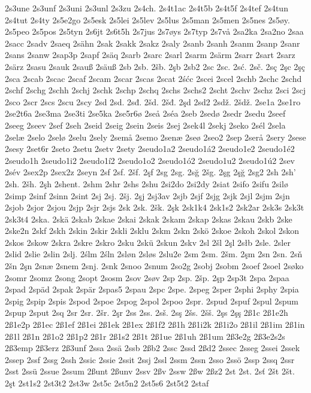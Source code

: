 2s3une
2s3unf
2s3uni
2s3unl
2s3zu
2s4ch.
2s4t1ac
2s4t5b
2s4t5f
2s4tef
2s4tun
2s4tut
2s4ty
2s5e2go
2s5esk
2s5lei
2s5lev
2s5lus
2s5man
2s5men
2s5nes
2s5øy.
2s5peo
2s5pos
2s5tyn
2s6jt
2s6t5h
2s7jus
2s7øys
2s7typ
2s7vå
2sa2ka
2sa2no
2saa
2sacc
2sadv
2saeq
2sähn
2sak
2sakk
2sakz
2saly
2sanb
2sanh
2sanm
2sanp
2sanr
2sans
2sanw
2sap3p
2sapf
2säq
2sarb
2sarc
2sarl
2sarm
2särm
2sarr
2sart
2sarz
2särz
2sasu
2sauk
2sauß
2säuß
2sb
2sb.
2šb.
2şb
2sb2
2sc
2sc.
2sć.
2sč.
2sç
2şc
2şç
2sca
2scab
2scac
2scaf
2scam
2scar
2scas
2scat
2śćc
2scei
2scel
2schb
2schc
2schd
2schf
2schg
2schh
2schj
2schk
2schp
2schq
2schs
2schs2
2scht
2schv
2schz
2sci
2scj
2sco
2scr
2scs
2scu
2scy
2sd
2sd.
2sđ.
2šd.
2šđ.
2şd
2sd2
2sdž.
2šdž.
2se1a
2se1ro
2se2t6a
2se3ma
2se3ti
2se5ka
2se5r6ø
2seå
2séa
2seb
2sedø
2sedr
2sedu
2seef
2seeg
2seev
2sef
2seh
2seid
2seig
2sein
2seis
2sej
2sek4l
2sekj
2seko
2sél
2sela
2selæ
2selo
2selø
2selu
2sely
2semå
2semo
2senæ
2seø
2seo2
2sep
2serå
2sery
2sese
2sesy
2set6r
2seto
2setu
2setv
2sety
2seudo1a2
2seudo1á2
2seudo1e2
2seudo1é2
2seudo1h
2seudo1i2
2seudo1í2
2seudo1o2
2seudo1ó2
2seudo1u2
2seudo1ú2
2sev
2sév
2sex2p
2sex2z
2seyn
2sf
2sf.
2šf.
2şf
2sg
2sg.
2sğ
2šg.
2şg
2şğ
2sg2
2sh
2sh'
2sh.
2šh.
2şh
2shent.
2shm
2shr
2shs
2shu
2si2do
2si2dy
2siat
2sifo
2sifu
2silø
2simp
2sinf
2sinn
2sint
2sj
2sj.
2šj.
2şj
2sj3av
2sjb
2sjf
2sjg
2sjk
2sjl
2sjm
2sjn
2sjob
2sjor
2sjou
2sjp
2sjr
2sjs
2sk
2sk.
2šk.
2şk
2sk1k4
2sk1s2
2sk2ar
2sk3s
2sk3t
2sk3t4
2ska.
2skä
2skab
2skae
2skai
2skak
2skam
2skap
2skas
2skau
2skb
2ske
2ske2n
2skf
2skh
2skin
2skir
2skli
2sklu
2skm
2skn
2skö
2skoe
2skoh
2skol
2skon
2skos
2skow
2skra
2skre
2skro
2sku
2skü
2skun
2skv
2sl
2šl
2şl
2słb
2sle.
2sler
2slid
2slie
2slin
2slj.
2ślm
2śln
2sløn
2sløs
2slu2e
2sm
2sm.
2šm.
2şm
2sn
2sn.
2sň
2šn
2şn
2snæ
2snem
2snj.
2snk
2snoo
2snum
2so2g
2sobj
2sobm
2soef
2soel
2søko
2somr
2somz
2song
2sopt
2sosm
2sov
2søv
2sp
2sp.
2šp.
2şp
2sp3t
2spa
2spaa
2spad
2späd
2spak
2spär
2spas5
2spau
2spc
2spe.
2speg
2sper
2sphi
2sphy
2spia
2spig
2spip
2spis
2spod
2spoe
2spog
2spol
2spoo
2spr.
2spud
2spuf
2spul
2spum
2spup
2sput
2sq
2sr
2sr.
2šr.
2şr
2ss
2ss.
2sš.
2sş
2šs.
2šš.
2şs
2şş
2ß1c
2ß1e2h
2ß1e2p
2ß1ec
2ß1ef
2ß1ei
2ß1ek
2ß1ex
2ß1f2
2ß1h
2ß1i2k
2ß1i2o
2ß1il
2ß1im
2ß1in
2ß1l
2ß1n
2ß1o2
2ß1p2
2ß1r
2ß1s2
2ß1t
2ß1ue
2ß1uh
2ß1um
2ß3e2g
2ß3e2s2s
2ß3emp
2ß3erz
2ß3unf
2ssa
2ssä
2ssb
2ßb2
2ssc
2ssd
2ßd2
2ssec
2sseg
2ssei
2ssek
2ssep
2ssf
2ssg
2ssh
2ssic
2ssie
2ssit
2ssj
2ssl
2ssm
2ssn
2sso
2ssö
2ssp
2ssq
2ssr
2sst
2ssü
2ssue
2ssum
2ßunt
2ßunv
2ssv
2ßv
2ssw
2ßw
2ßz2
2st
2st.
2sť
2št
2št.
2şt
2st1s2
2st3t2
2st3w
2st5c
2st5n2
2st5s6
2st5t2
2staf
